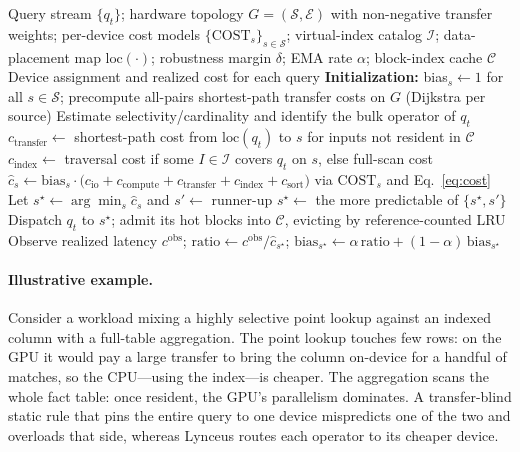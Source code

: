 \documentclass{article}
\begin{document}
\begin{algorithm}[t]
\caption{Lynceus: Cost-Model-Driven Per-Operator Query Routing}
\label{alg:lynceus}
\begin{algorithmic}[1]
\REQUIRE Query stream $\{q_t\}$; hardware topology $G=(\mathcal{S},\mathcal{E})$
  with non-negative transfer weights; per-device cost models
  $\{\mathrm{COST}_s\}_{s\in\mathcal{S}}$; virtual-index catalog $\mathcal{I}$;
  data-placement map $\mathrm{loc}(\cdot)$; robustness margin $\delta$; EMA rate
  $\alpha$; block-index cache $\mathcal{C}$
\ENSURE Device assignment and realized cost for each query
\STATE \textbf{Initialization:} bias$_s \gets 1$ for all $s\in\mathcal{S}$;
  precompute all-pairs shortest-path transfer costs on $G$ (Dijkstra per source)
  \STATE Estimate selectivity/cardinality and identify the bulk operator of $q_t$
    \STATE $c_{\mathrm{transfer}} \gets$ shortest-path cost from
      $\mathrm{loc}(q_t)$ to $s$ for inputs not resident in $\mathcal{C}$
    \STATE $c_{\mathrm{index}} \gets$ traversal cost if some $I\in\mathcal{I}$
      covers $q_t$ on $s$, else full-scan cost
    \STATE $\widehat{c}_s \gets \mathrm{bias}_s \cdot \big(c_{\mathrm{io}} +
      c_{\mathrm{compute}} + c_{\mathrm{transfer}} + c_{\mathrm{index}} +
      c_{\mathrm{sort}}\big)$ \quad via $\mathrm{COST}_s$ and
      Eq.~\eqref{eq:cost}
  \ENDFOR
  \STATE Let $s^\star \gets \arg\min_s \widehat{c}_s$ and $s' \gets$ runner-up
    \STATE $s^\star \gets$ the more predictable of $\{s^\star, s'\}$
  \ENDIF
  \STATE Dispatch $q_t$ to $s^\star$; admit its hot blocks into $\mathcal{C}$,
    evicting by reference-counted LRU
  \STATE Observe realized latency $c^{\mathrm{obs}}$;
    $\mathrm{ratio} \gets c^{\mathrm{obs}} / \widehat{c}_{s^\star}$;
    $\mathrm{bias}_{s^\star} \gets \alpha\,\mathrm{ratio} +
    (1-\alpha)\,\mathrm{bias}_{s^\star}$
\ENDFOR
\end{algorithmic}
\end{algorithm}

\paragraph{Illustrative example.} Consider a workload mixing a highly selective
point lookup against an indexed column with a full-table aggregation. The point
lookup touches few rows: on the GPU it would pay a large transfer to bring the
column on-device for a handful of matches, so the CPU---using the index---is
cheaper. The aggregation scans the whole fact table: once resident, the GPU's
parallelism dominates. A transfer-blind static rule that pins the entire query to
one device mispredicts one of the two and overloads that side, whereas Lynceus
routes each operator to its cheaper device.
\end{document}
